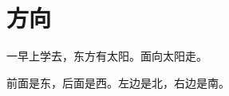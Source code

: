 \documentclass[12pt,UTF-8,openany]{ctexbook}
\begin{document}
\hanzibox{}\hanzibox{}\hanzibox{}\hanzibox{}\hspace{1em}\hanzibox{}\hanzibox{}\hanzibox{}\hanzibox{}

\hanzibox{}\hanzibox{}\hanzibox{}\hanzibox{}\hspace{1em}\hanzibox{}\hanzibox{}\hanzibox{}\hanzibox{}

\hanzibox{}\hanzibox{}\hanzibox{}\hanzibox{}\hspace{1em}\hanzibox{}\hanzibox{}\hanzibox{}\hanzibox{}






\chapter{方向}

\begin{large}
    
    一早上学去，东方有太阳。面向太阳走。
    
    前面是东，后面是西。左边是北，右边是南。
    
\end{large}


\clearpage

\begin{center}
    
    
\end{center}


\hanzibox{}\hanzibox{}\hanzibox{}\hanzibox{}\hspace{1em}\hanzibox{}\hanzibox{}\hanzibox{}\hanzibox{}

\hanzibox{}\hanzibox{}\hanzibox{}\hanzibox{}\hspace{1em}\hanzibox{}\hanzibox{}\hanzibox{}\hanzibox{}

\hanzibox{}\hanzibox{}\hanzibox{}\hanzibox{}\hspace{1em}\hanzibox{}\hanzibox{}\hanzibox{}\hanzibox{}

\hanzibox{}\hanzibox{}\hanzibox{}\hanzibox{}\hspace{1em}\hanzibox{}\hanzibox{}\hanzibox{}\hanzibox{}
\end{document}
